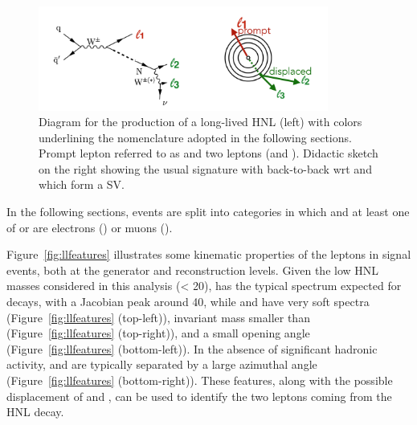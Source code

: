 \begin{figure}[h]
\centering
\includegraphics[width=0.85\textwidth]{Figures/c6/llsketch}
\caption{Diagram for the production of a long-lived HNL (left) with colors
  underlining the nomenclature adopted in the following
  sections. Prompt lepton referred to as \lone and two \displ leptons (\ltwo and \lthree). Didactic sketch on the right showing the usual signature with
 \lone back-to-back wrt \ltwo and \lthree which form a SV.}
\label{fig:c6llsketch}
\end{figure}

In the following sections, events are split into  
categories in which \lone and at least one of \ltwo or \lthree are
electrons (\eex) or muons (\mmx).

Figure~\ref{fig:llfeatures} illustrates some
kinematic properties of the leptons in signal events, both at the
generator and reconstruction levels.
Given the low HNL masses considered in this analysis (\mhnl < 20\GeV),
\lone has the typical \pt spectrum expected for \PW decays, with a
Jacobian peak around 40\GeV,
while \ltwo and \lthree have very soft \pt spectra
(Figure~\ref{fig:llfeatures} (top-left)), invariant mass smaller than
\mhnl (Figure~\ref{fig:llfeatures} (top-right)), and a small opening angle
(Figure~\ref{fig:llfeatures} (bottom-left)).
In the absence of significant hadronic activity, \lone and \hnl are
typically separated by a large azimuthal angle
(Figure~\ref{fig:llfeatures} (bottom-right)).
These features, along with the possible displacement of \ltwo and
\lthree, can be used to identify the two leptons coming from the HNL
decay.

